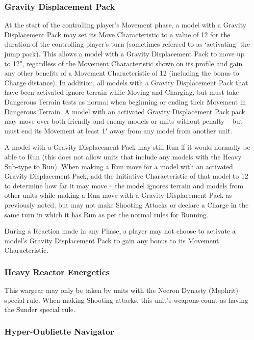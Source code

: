 \subsubsection{Gravity Displacement Pack} \label{Gravity Displacement Pack}

At the start of the controlling player’s Movement phase, a model with a Gravity Displacement Pack may set its Move Characteristic to a value of 12 for the duration of the controlling player’s turn (sometimes referred to as ‘activating’ the jump pack). This allows a model with a Gravity Displacement Pack to move up to 12", regardless of the Movement Characteristic shown on its profile and gain any other benefits of a Movement Characteristic of 12 (including the bonus to Charge distance). In addition, all models with a Gravity Displacement Pack that have been activated ignore terrain while Moving and Charging, but must take Dangerous Terrain tests as normal when beginning or ending their Movement in Dangerous Terrain. A model with an activated Gravity Displacement Pack pack may move over both friendly and enemy models or units without penalty – but must end its Movement at least 1" away from any model from another unit.

A model with a Gravity Displacement Pack may still Run if it would normally be able to Run (this does not allow units that include any models with the Heavy Sub-type to Run). When making a Run move for a model with an activated Gravity Displacement Pack, add the Initiative Characteristic of that model to 12 to determine how far it may move – the model ignores terrain and models from other units while making a Run move with a Gravity Displacement Pack as previously noted, but may not make Shooting Attacks or declare a Charge in the same turn in which it has Run as per the normal rules for Running.

During a Reaction made in any Phase, a player may not choose to activate a model’s Gravity Displacement Pack to gain any bonus to its Movement Characteristic.

\subsubsection{Heavy Reactor Energetics} \label{Heavy Reactor Energetics}

This wargear may only be taken by units with the Necron Dynasty (Mephrit) special rule. When making Shooting attacks, this unit's weapons count as having the Sunder special rule.

\subsubsection{Hyper-Oubliette Navigator} \label{Hyper-Oubliette Navigator}

